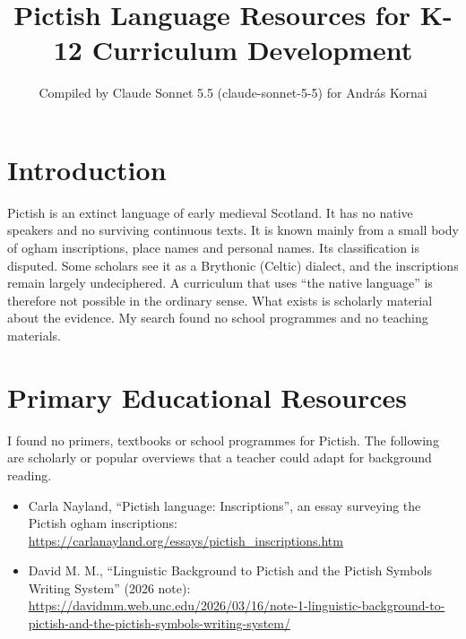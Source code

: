 \documentclass[12pt]{article}
\title{Pictish Language Resources for K-12 Curriculum Development}
\author{Compiled by Claude Sonnet 5.5 (claude-sonnet-5-5) for Andr\'as Kornai}
\date{}
\begin{document}
\maketitle

\section{Introduction}
Pictish is an extinct language of early medieval Scotland. It has no native speakers and no surviving continuous texts. It is known mainly from a small body of ogham inscriptions, place names and personal names. Its classification is disputed. Some scholars see it as a Brythonic (Celtic) dialect, and the inscriptions remain largely undeciphered. A curriculum that uses ``the native language'' is therefore not possible in the ordinary sense. What exists is scholarly material about the evidence. My search found no school programmes and no teaching materials.

\section{Primary Educational Resources}
I found no primers, textbooks or school programmes for Pictish. The following are scholarly or popular overviews that a teacher could adapt for background reading.
\begin{itemize}
\item Carla Nayland, ``Pictish language: Inscriptions'', an essay surveying the Pictish ogham inscriptions: \url{https://carlanayland.org/essays/pictish_inscriptions.htm}
\item David M. M., ``Linguistic Background to Pictish and the Pictish Symbols Writing System'' (2026 note): \url{https://davidmm.web.unc.edu/2026/03/16/note-1-linguistic-background-to-pictish-and-the-pictish-symbols-writing-system/}
\end{itemize}
\end{document}
